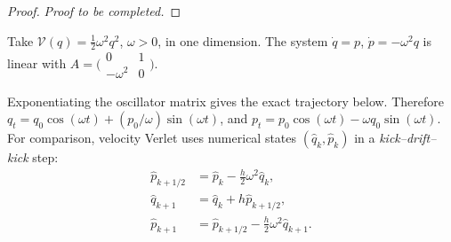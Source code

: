 \documentclass[12pt,a4paper,oneside]{book}
\begin{document}
\begin{proof}
\noindent\textit{Proof to be completed.}
\end{proof}



\begin{example}
\label{ex:harmonic-scheme}
\leavevmode\par\nobreak
\begin{Question}
Take $\mathcal V(q)=\frac12\omega^2q^2$, $\omega>0$, in one dimension.
The system $\dot q=p$, $\dot p=-\omega^2q$ is linear with
$A=\bigl(\begin{smallmatrix}0&1\\-\omega^2&0\end{smallmatrix}\bigr)$.
\end{Question}
\begin{solution}
Exponentiating the oscillator matrix gives the exact trajectory below.
Therefore $q_t=q_0\cos(\omega t)+(p_0/\omega)\sin(\omega t)$,
and $p_t=p_0\cos(\omega t)-\omega q_0\sin(\omega t)$.
For comparison, velocity Verlet uses numerical states $(\widehat q_k,\widehat p_k)$ in a \emph{kick--drift--kick} step:
\begin{equation}
\begin{aligned}
\widehat p_{k+1/2}&=\widehat p_k-\tfrac h2\omega^2\widehat q_k,\\
\widehat q_{k+1}&=\widehat q_k+h\widehat p_{k+1/2},\\
\widehat p_{k+1}&=\widehat p_{k+1/2}-\tfrac h2\omega^2\widehat q_{k+1}.
\end{aligned}

\end{equation}
\end{solution}
\end{example}
\end{document}
